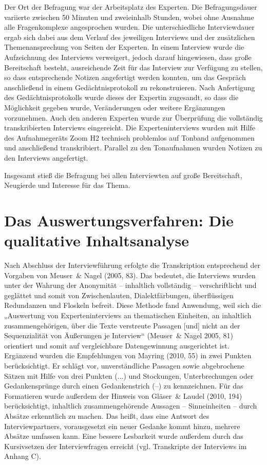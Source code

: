 Der Ort der Befragung war der Arbeitsplatz des Experten. Die Befragungsdauer variierte zwischen 50 Minuten und zweieinhalb Stunden, wobei ohne Ausnahme alle Fragenkomplexe angesprochen wurden. Die unterschiedliche Interviewdauer ergab sich dabei aus dem Verlauf des jeweiligen Interviews und der zusätzlichen Themenansprechung von Seiten der Experten. In einem Interview wurde die Aufzeichnung des Interviews verweigert, jedoch darauf hingewiesen, dass große Bereitschaft besteht, ausreichende Zeit für das Interview zur Verfügung zu stellen, so dass entsprechende Notizen angefertigt werden konnten, um das Gespräch anschließend in einem Gedächtnisprotokoll zu rekonstruieren. Nach Anfertigung des Gedächtnisprotokolls wurde dieses der Expertin zugesandt, so dass die Möglichkeit gegeben wurde, Veränderungen oder weitere Ergänzungen vorzunehmen. Auch den anderen Experten wurde zur Überprüfung die vollständig transkribierten Interviews eingereicht. 
Die Experteninterviews wurden mit Hilfe des Aufnahmegeräts Zoom H2 technisch problemlos auf Tonband aufgenommen und anschließend transkribiert. Parallel zu den Tonaufnahmen wurden Notizen zu den Interviews angefertigt. 

Insgesamt stieß die Befragung bei allen Interviewten auf große Bereitschaft, Neugierde und Interesse für das Thema.

\section{Das Auswertungsverfahren: Die qualitative Inhaltsanalyse}

Nach Abschluss der Interviewführung erfolgte die Transkription entsprechend der Vorgaben von Meuser~\& Nagel (2005, 83). Das bedeutet, die Interviews wurden unter der Wahrung der Anonymität -- inhaltlich vollständig -- verschriftlicht und geglättet und somit von Zwischenlauten, Dialektfärbungen, überflüssigen Redundanzen und Floskeln befreit. Diese Methode fand Anwendung, weil sich die „Auswertung von Experteninterviews an thematischen Einheiten, an inhaltlich zusammengehörigen, über die Texte verstreute Passagen [und] nicht an der Sequenzialität von Äußerungen je Interview“ (Meuser~\& Nagel 2005, 81) orientiert und somit auf vergleichbare Datengewinnung ausgerichtet ist. 
Ergänzend wurden die Empfehlungen von Mayring (2010, 55) in zwei Punkten berücksichtigt. Er schlägt vor, unverständliche Passagen sowie abgebrochene Sätzen mit Hilfe von drei Punkten (...) und Stockungen, Unterbrechungen oder Gedankensprünge durch einen Gedankenstrich (--) zu kennzeichnen. 
Für das Formatieren wurde außerdem der Hinweis von Gläser~\& Laudel (2010, 194) berücksichtigt, inhaltlich zusammengehörende Aussagen -- Sinneinheiten -- durch Absätze erkenntlich zu machen. Das heißt, dass eine Antwort des Interviewpartners, vorausgesetzt ein neuer Gedanke kommt hinzu, mehrere Absätze umfassen kann. Eine bessere Lesbarkeit wurde außerdem durch das Kursivsetzen der Interviewfragen erreicht (vgl. Transkripte der Interviews im Anhang C). 

